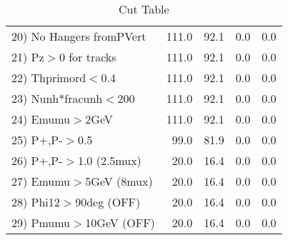 \begin{table}[h!]
\begin{tabular}{||l||r|r|r|r||}
 20) No Hangers fromPVert &       111.0 &        92.1 &         0.0 &         0.0 \\
 21) Pz$>$0 for tracks    &       111.0 &        92.1 &         0.0 &         0.0 \\
 22) Thprimord$<$0.4      &       111.0 &        92.1 &         0.0 &         0.0 \\
 23) Nunh*fracunh$<$200   &       111.0 &        92.1 &         0.0 &         0.0 \\
 24) Emumu$>$2GeV         &       111.0 &        92.1 &         0.0 &         0.0 \\
 25) P+,P-$>$0.5          &        99.0 &        81.9 &         0.0 &         0.0 \\
 26) P+,P-$>$1.0 (2.5mux) &        20.0 &        16.4 &         0.0 &         0.0 \\
 27) Emumu$>$5GeV  (8mux) &        20.0 &        16.4 &         0.0 &         0.0 \\
 28) Phi12$>$90deg  (OFF) &        20.0 &        16.4 &         0.0 &         0.0 \\
 29) Pmumu$>$10GeV  (OFF) &        20.0 &        16.4 &         0.0 &         0.0 \\
 \hline
 \hline
 \end{tabular}
 \caption{Cut Table \cohjp  }
 \label{tab-cut__jpsi}
 \end{table}
